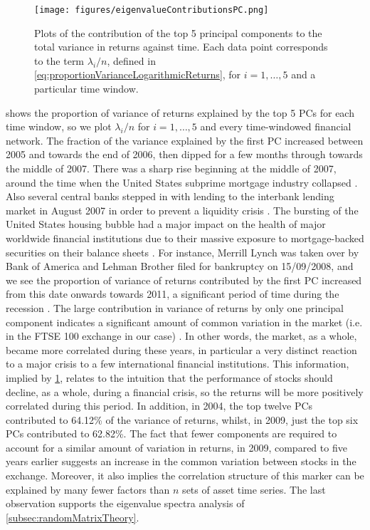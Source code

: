 \begin{figure}
	\centering
	\texttt{[image: figures/eigenvalueContributionsPC.png]}
	\caption[Plots of the contribution of the top 5 principal components to the total variance in returns against time.]{\label{fig:eigenvalueContributionsPC} Plots of the contribution of the top 5 principal components to the total variance in returns against time. Each data point corresponds to the term $\lambda_{i}/n$, defined in \cref{eq:proportionVarianceLogarithmicReturns}, for $i=1,\dots,5$ and a particular time window.}
\end{figure}

 shows the proportion of variance of returns explained by the top 5 PCs for each time window, so we plot $\lambda_{i}/n$ for $i=1,\dots,5$ and every time-windowed financial network.
The fraction of the variance explained by the first PC increased between 2005 and towards the end of 2006, then dipped for a few months through towards the middle of 2007.
There was a sharp rise beginning at the middle of 2007, around the time when the United States subprime mortgage industry collapsed \cite{GrWik}.
Also several central banks stepped in with lending to the interbank lending market in August 2007 in order to prevent a liquidity crisis \cite{BKM13,GrWik}.
The bursting of the United States housing bubble had a major impact on the health of major worldwide financial institutions due to their massive exposure to mortgage-backed securities on their balance sheets \cite{BKM13,GrWik}.
For instance, Merrill Lynch was taken over by Bank of America and Lehman Brother filed for bankruptcy on 15/09/2008, and we see the proportion of variance of returns contributed by the first PC increased from this date onwards towards 2011, a significant period of time during the recession \cite{FPW+11,GrWik}.
The large contribution in variance of returns by only one principal component indicates a significant amount of common variation in the market (i.e. in the FTSE 100 exchange in our case) \cite{FPW+11}.
In other words, the market, as a whole, became more correlated during these years, in particular a very distinct reaction to a major crisis to a few international financial institutions.
This information, implied by \cref{fig:eigenvalueContributionsPC}, relates to the intuition that the performance of stocks should decline, as a whole, during a financial crisis, so the returns will be more positively correlated during this period.
In addition, in 2004, the top twelve PCs contributed to 64.12\% of the variance of returns, whilst, in 2009, just the top six PCs contributed to 62.82\%.
The fact that fewer components are required to account for a similar amount of variation in returns, in 2009, compared to five years earlier suggests an increase in the common variation between stocks in the exchange.
Moreover, it also implies the correlation structure of this marker can be explained by many fewer factors than $n$ sets of asset time series.
The last observation supports the eigenvalue spectra analysis of \cref{subsec:randomMatrixTheory}.

